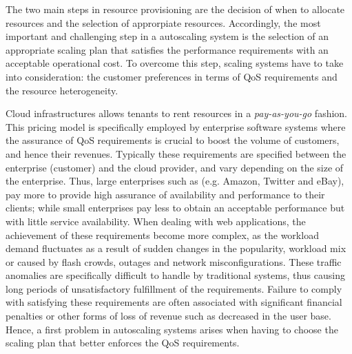 The two main steps in resource provisioning are the decision of when to allocate resources and the selection of approrpiate resources.
Accordingly, the most important and challenging step in a autoscaling system is the selection of an appropriate scaling plan that satisfies the performance requirements with an acceptable operational cost. 
To overcome this step, scaling systems have to take into consideration: the customer preferences in terms of QoS requirements and the resource heterogeneity.

Cloud infrastructures allows tenants to rent resources in a \emph{pay-as-you-go} fashion. This pricing model is specifically employed by enterprise software systems where the assurance of QoS requirements is crucial to boost the volume of customers, and hence their revenues. Typically these requirements are specified between the enterprise (customer) and the cloud provider, and vary depending on the size of the enterprise. Thus, large enterprises such as (e.g. Amazon, Twitter and eBay), pay more to provide high assurance of availability and performance to their clients; while small enterprises pay less to obtain an acceptable performance but with little service availability. When dealing with web applications, the achievement of these requirements become more complex, as the workload demand fluctuates as a result of sudden changes in the popularity, workload mix or caused by flash crowds, outages and network misconfigurations. These traffic anomalies are specifically difficult to handle by traditional systems, thus causing long periods of unsatisfactory fulfillment of the requirements. Failure to comply with satisfying these requirements are often associated with significant financial penalties or other forms of loss of revenue such as decreased in the user base. Hence, a first problem in autoscaling systems arises when having to choose the scaling plan that better enforces the QoS requirements. 


